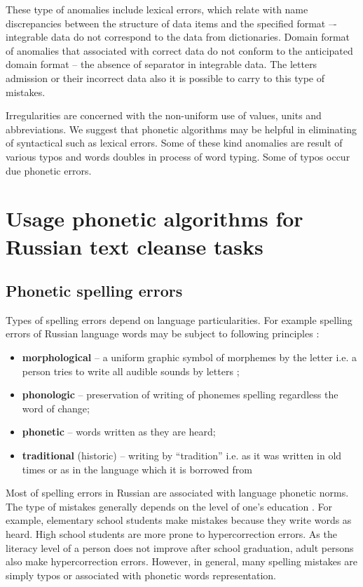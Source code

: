 \documentclass[conference,a4paper]{IEEEtran}
\begin{document}
These type of anomalies include lexical errors, which relate with name discrepancies between the structure of data items and the specified format –- integrable data do not correspond to the data from dictionaries.  Domain format of anomalies that associated with correct data do not conform to the anticipated domain format – the absence of separator in integrable data. The letters admission or their incorrect data also it is possible to carry to this type of mistakes.

Irregularities are concerned with the non-uniform use of values, units and abbreviations.
We suggest that phonetic algorithms may be helpful in eliminating of syntactical such as lexical errors. Some of these kind anomalies are result of various typos and words doubles in process of word typing. Some of typos occur due phonetic errors.

\section{Usage phonetic algorithms for Russian text cleanse tasks}
\subsection{Phonetic spelling errors}
Types of spelling errors depend on language particularities. For example spelling errors of Russian language words may be subject to following principles \cite{Skripnik-2010}:
\begin{itemize}
\item \textbf{morphological} – a uniform graphic symbol of morphemes by the letter i.e. a person tries to write all audible sounds by letters \cite{Valgina-2002};
\item \textbf{phonologic} – preservation of writing of phonemes spelling regardless the word of change;
\item \textbf{phonetic} – words written as they are heard;
\item \textbf{traditional} (historic) – writing by “tradition” i.e. as it was written in old times or as in the language which it is borrowed from
\end{itemize}

Most of spelling errors in Russian are associated with language phonetic norms. The type of mistakes generally depends on the level of one’s education \cite{Parubchenko-2005}. For example, elementary school students make mistakes because they write words as heard. High school students are more prone to hypercorrection errors. As the literacy level of a person does not improve after school graduation, adult persons also make hypercorrection errors. However, in general, many spelling mistakes are simply typos or associated with phonetic words representation.
\end{document}
